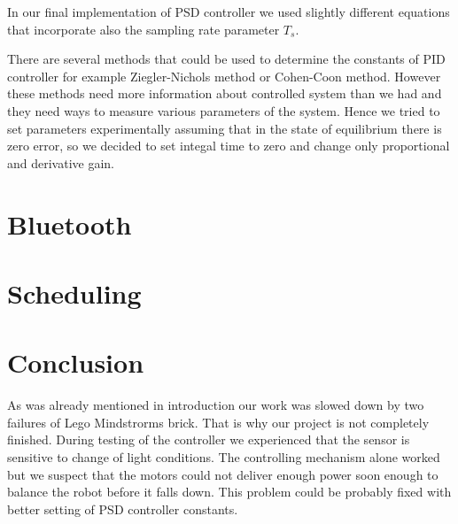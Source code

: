 \documentclass{article}
\begin{document}
In our final implementation of PSD controller we used slightly different
equations that incorporate also the sampling rate parameter $T_s$. \cite{tar}

There are several methods that could be used to determine the constants of PID
controller for example Ziegler-Nichols method or Cohen-Coon method. However
these methods need more information about controlled system than we had and they
need ways to measure various parameters of the system. Hence we tried to set
parameters experimentally assuming that in the state of equilibrium there is
zero error, so we decided to set integal time to zero and change only
proportional and derivative gain.

\section{Bluetooth}

\section{Scheduling}

\section{Conclusion}

As was already mentioned in introduction our work was slowed down by two
failures of Lego Mindstrorms brick. That is why our project is not completely
finished. During testing of the controller we experienced that the sensor is
sensitive to change of light conditions. The controlling mechanism alone worked
but we suspect that the motors could not deliver enough power soon enough to
balance the robot before it falls down. This problem could be probably fixed
with better setting of PSD controller constants.

\printbibliography
\end{document}
